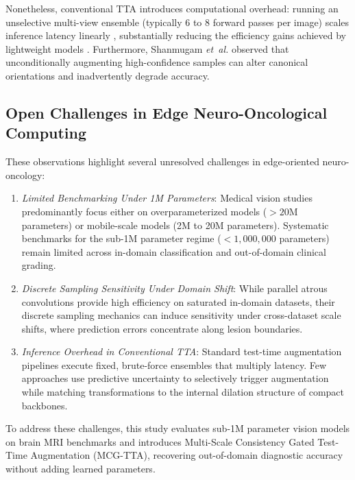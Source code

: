 Nonetheless, conventional TTA introduces computational overhead: running an unselective multi-view ensemble (typically 6 to 8 forward passes per image) scales inference latency linearly \cite{42}, substantially reducing the efficiency gains achieved by lightweight models \cite{35, 42}. Furthermore, Shanmugam \emph{et~al.} \cite{42} observed that unconditionally augmenting high-confidence samples can alter canonical orientations and inadvertently degrade accuracy.

\subsection{Open Challenges in Edge Neuro-Oncological Computing}
These observations highlight several unresolved challenges in edge-oriented neuro-oncology:
\begin{enumerate}
\item \emph{Limited Benchmarking Under 1M Parameters}: Medical vision studies predominantly focus either on overparameterized models ($>20$M parameters) or mobile-scale models (2M to 20M parameters). Systematic benchmarks for the sub-1M parameter regime ($<1,000,000$ parameters) remain limited across in-domain classification and out-of-domain clinical grading.
\item \emph{Discrete Sampling Sensitivity Under Domain Shift}: While parallel atrous convolutions provide high efficiency on saturated in-domain datasets, their discrete sampling mechanics can induce sensitivity under cross-dataset scale shifts, where prediction errors concentrate along lesion boundaries.
\item \emph{Inference Overhead in Conventional TTA}: Standard test-time augmentation pipelines execute fixed, brute-force ensembles that multiply latency. Few approaches use predictive uncertainty to selectively trigger augmentation while matching transformations to the internal dilation structure of compact backbones.
\end{enumerate}

To address these challenges, this study evaluates sub-1M parameter vision models on brain MRI benchmarks and introduces Multi-Scale Consistency Gated Test-Time Augmentation (MCG-TTA), recovering out-of-domain diagnostic accuracy without adding learned parameters.
